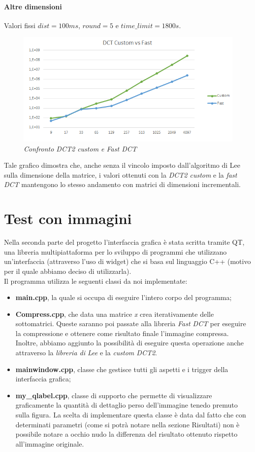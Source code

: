 \documentclass[a4paper,12pt]{report}
\newcommand{\mychapter}[2]{
    \setcounter{chapter}{#1}
    \setcounter{section}{0}
    \chapter*{#2}
    \addcontentsline{toc}{chapter}{#2}
}
\begin{document}
\subsubsection*{Altre dimensioni}
Valori fissi \(dist=100ms\), \(round=5\) e \(time\_limit=1800s\).
\begin{figure}[H]
\centering
\includegraphics[width=0.77\linewidth]{../img/customvsfast.png}
\caption{\textit{Confronto DCT2 custom e Fast DCT}}
\end{figure}

Tale grafico dimostra che, anche senza il vincolo imposto dall'algoritmo di Lee sulla dimensione della matrice, i valori ottenuti con la \textit{DCT2 custom} e la \textit{fast DCT} mantengono lo stesso andamento con matrici di dimensioni incrementali. 


\mychapter{2}{Test con immagini}
Nella seconda parte del progetto l'interfaccia grafica è stata scritta tramite QT, una libreria multipiattaforma per lo sviluppo di programmi che utilizzano un'interfaccia (attraverso l'uso di widget) che si basa sul linguaggio C++ (motivo per il quale abbiamo deciso di utilizzarla).\\
Il programma utilizza le seguenti classi da noi implementate:
\begin{itemize}
\item \textbf{main.cpp}, la quale si occupa di eseguire l'intero corpo del programma;
\item \textbf{Compress.cpp}, che data una matrice \textit{x} crea iterativamente delle sottomatrici. Queste saranno poi passate alla libreria \textit{Fast DCT} per eseguire la compressione e ottenere come risultato finale l'immagine compressa. Inoltre, abbiamo aggiunto la possibilità di eseguire questa operazione anche attraverso la \textit{libreria di Lee} e la \textit{custom DCT2}.
\item \textbf{mainwindow.cpp}, classe che gestisce tutti gli aspetti e i trigger della interfaccia grafica;
\item \textbf{my\_qlabel.cpp}, classe di supporto che permette di visualizzare graficamente la quantità di dettaglio perso dell'immagine tenedo premuto sulla figura. La scelta di implementare questa classe è data dal fatto che con determinati parametri (come si potrà notare nella sezione Risultati) non è possibile notare a occhio nudo la differenza del risultato ottenuto rispetto all'immagine originale.
\end{itemize}
\end{document}
